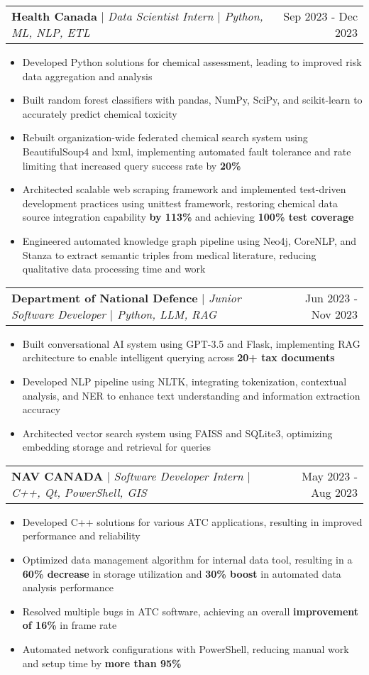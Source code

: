 \documentclass[letterpaper,10pt]{article}
\makeatletter
\newcommand{\resumeItem}[1]{
  \item\small{
    {#1 \vspace{-3pt}}
  }
}
\newcommand{\resumeSubheading}[3]{
    \item
    \begin{tabular*}{0.97\textwidth}[t]{l@{\extracolsep{\fill}}r}
      \textbf{#1} $|$ \textit{ #2} & #3 \\
    \end{tabular*}\vspace{-6pt}
}
\newcommand{\resumeItemListStart}{\begin{itemize}}
\newcommand{\resumeItemListEnd}{\end{itemize}\vspace{-5pt}}
\makeatother
\begin{document}
    \resumeSubheading{Health Canada}{Data Scientist Intern $|$ Python, ML, NLP, ETL}{Sep 2023 - Dec 2023}
      \resumeItemListStart
        \resumeItem{Developed Python solutions for chemical assessment, leading to improved risk data aggregation and analysis}
        \resumeItem{Built random forest classifiers with pandas, NumPy, SciPy, and scikit-learn to accurately predict chemical toxicity}
        \resumeItem{Rebuilt organization-wide federated chemical search system using BeautifulSoup4 and lxml, implementing automated fault tolerance and rate limiting that increased query success rate by \textbf{20\%}}
        \resumeItem{Architected scalable web scraping framework and implemented test-driven development practices using unittest framework, restoring chemical data source integration capability \textbf{by 113\%} and achieving \textbf{100\% test coverage}}
        \resumeItem{Engineered automated knowledge graph pipeline using Neo4j, CoreNLP, and Stanza to extract semantic triples from medical literature, reducing qualitative data processing time and work}
      \resumeItemListEnd

    \resumeSubheading{Department of National Defence}{Junior Software Developer $|$ Python, LLM, RAG}{Jun 2023 - Nov 2023}
      \resumeItemListStart
        \resumeItem{Built conversational AI system using GPT-3.5 and Flask, implementing RAG architecture to enable intelligent querying across \textbf{20+ tax documents}}
        \resumeItem{Developed NLP pipeline using NLTK, integrating tokenization, contextual analysis, and NER to enhance text understanding and information extraction accuracy}
        \resumeItem{Architected vector search system using FAISS and SQLite3, optimizing embedding storage and retrieval for queries}
      \resumeItemListEnd

    \resumeSubheading{NAV CANADA}{Software Developer Intern $|$ C++, Qt, PowerShell, GIS}{May 2023 - Aug 2023}
      \resumeItemListStart
        \resumeItem{Developed C++ solutions for various ATC applications, resulting in improved performance and reliability}
        \resumeItem{Optimized data management algorithm for internal data tool, resulting in a \textbf{60\% decrease} in storage utilization and \textbf{30\% boost} in automated data analysis performance}
        \resumeItem{Resolved multiple bugs in ATC software, achieving an overall \textbf{improvement of 16\% } in frame rate}
        \resumeItem{Automated network configurations with PowerShell, reducing manual work and setup time by \textbf{more than 95\%}}
      \resumeItemListEnd
\end{document}
